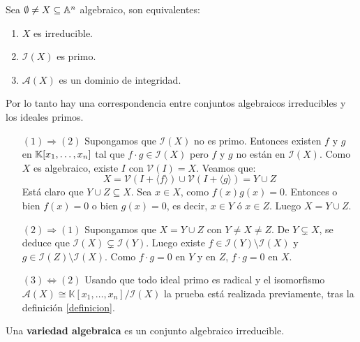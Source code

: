 \documentclass[ACGA.tex]{subfiles}
\begin{document}
\begin{prop}
Sea $\emptyset \neq X \subseteq \mathbb{A}^n$ algebraico, son equivalentes:
\begin{enumerate}
	\item $X$ es irreducible.
	\item $\mathcal{I}(X)$ es primo.
	\item $\mathcal{A}(X)$ es un dominio de integridad.
\end{enumerate}
	Por lo tanto hay una correspondencia entre conjuntos algebraicos irreducibles y los ideales primos.
\end{prop}
\begin{dem}\mbox{}
\begin{itemize}
	\item[$(1) \Rightarrow (2)$] Supongamos que $\mathcal{I}(X)$ no es primo. Entonces existen $f$ y $g$ en $\mathbb{K}[x_1,\dots,x_n]$ tal que $f\cdot g \in \mathcal{I}(X)$ pero $f$ y $g$ no están en $\mathcal{I}(X)$. Como $X$ es algebraico, existe $I$ con $\mathcal{V}(I)=X$. Veamos que:
	\[ X = \mathcal{V}(I + \langle f\rangle) \cup \mathcal{V}(I+\langle g\rangle) = Y \cup Z \]
	Está claro que $Y \cup Z \subseteq X$. Sea $x \in X$, como $f(x)g(x) = 0$. Entonces o bien $f(x)=0$ o bien $g(x)=0$, es decir, $x \in Y$ ó $x \in Z$. Luego $X = Y \cup Z$.
	
	\item[$(2) \Rightarrow (1)$] Supongamos que $X = Y \cup Z$ con $Y \neq X \neq Z$. De $Y \subsetneq X$, se deduce que $\mathcal{I}(X) \subsetneq \mathcal{I}(Y)$. Luego existe $f \in \mathcal{I}(Y) \setminus \mathcal{I}(X)$ y $g \in \mathcal{I}(Z) \setminus \mathcal{I}(X)$. Como $f \cdot g = 0$ en $Y$ y en $Z$, $f \cdot g = 0$ en $X$.
	
	\item[$(3) \Leftrightarrow (2)$] Usando que todo ideal primo es radical y el isomorfismo $\mathcal{A}(X)\cong\mathbb{K}[x_1,\dots,x_n]/\mathcal{I}(X)$ la prueba está realizada previamente, tras la definición \ref{definicion}.\QED
\end{itemize}
\end{dem}

\begin{defi}
Una \textbf{variedad algebraica} es un conjunto algebraico irreducible.
\end{defi}
\end{document}
